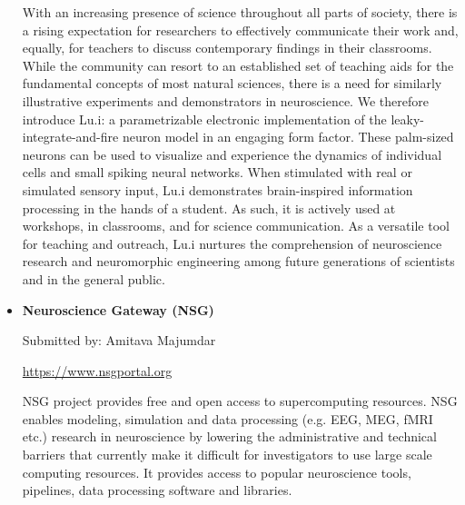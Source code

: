 \begin{itemize}
        With an increasing presence of science throughout all parts of society, there is a rising expectation for researchers to effectively communicate their work and, equally, for teachers to discuss contemporary findings in their classrooms. While the community can resort to an established set of teaching aids for the fundamental concepts of most natural sciences, there is a need for similarly illustrative experiments and demonstrators in neuroscience. We therefore introduce Lu.i: a parametrizable electronic implementation of the leaky-integrate-and-fire neuron model in an engaging form factor. These palm-sized neurons can be used to visualize and experience the dynamics of individual cells and small spiking neural networks. When stimulated with real or simulated sensory input, Lu.i demonstrates brain-inspired information processing in the hands of a student. As such, it is actively used at workshops, in classrooms, and for science communication. As a versatile tool for teaching and outreach, Lu.i nurtures the comprehension of neuroscience research and neuromorphic engineering among future generations of scientists and in the general public.

    \item \textbf{Neuroscience Gateway (NSG)}

        Submitted by: Amitava Majumdar

        \url{https://www.nsgportal.org}

        NSG project provides free and open access to supercomputing resources. NSG enables modeling, simulation and data processing (e.g. EEG, MEG, fMRI etc.) research in neuroscience by lowering the administrative and technical barriers that currently make it difficult for investigators to use large scale computing resources. It provides access to popular neuroscience tools, pipelines, data processing software and libraries.

\end{itemize}

